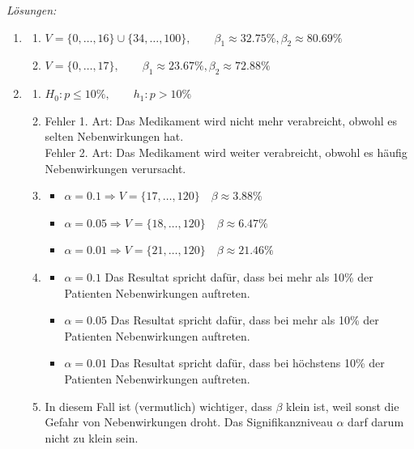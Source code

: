 \clearpage
\emph{Lösungen:}
\begin{enumerate}
    \item

          \begin{enumerate}
              \item \(V=\{0,\dots, 16\} \cup \{34,\dots, 100\}, \qquad \beta_1\approx 32.75\%, \beta_2 \approx 80.69\%\)
              \item  \(V=\{0,\dots, 17\} , \qquad \beta_1\approx 23.67\%, \beta_2 \approx 72.88\%\)
          \end{enumerate}
    \item \begin{enumerate}
              \item \(H_0: p\le 10\%, \qquad h_1: p > 10\%\)
              \item Fehler 1. Art: Das Medikament wird nicht mehr verabreicht, obwohl es selten Nebenwirkungen hat.\\
                    Fehler 2. Art: Das Medikament wird weiter verabreicht, obwohl es häufig Nebenwirkungen verursacht.
              \item \begin{itemize}
                        \item \(\alpha = 0.1 \Rightarrow V = \{17, \dots, 120\} \quad \beta \approx 3.88\%\)
                        \item \(\alpha = 0.05 \Rightarrow V = \{18, \dots, 120\} \quad \beta \approx 6.47\%\)
                        \item \(\alpha = 0.01 \Rightarrow V = \{21, \dots, 120\} \quad \beta \approx 21.46\%\)
                    \end{itemize}
              \item
                    \begin{itemize}
                        \item \(\alpha = 0.1\) Das Resultat spricht dafür, dass bei mehr als 10\% der Patienten Nebenwirkungen auftreten.
                        \item \(\alpha = 0.05\) Das Resultat spricht dafür, dass bei mehr als 10\% der Patienten Nebenwirkungen auftreten.
                        \item \(\alpha = 0.01\) Das Resultat spricht dafür, dass bei höchstens 10\% der Patienten Nebenwirkungen auftreten.
                    \end{itemize}
              \item In diesem Fall ist (vermutlich) wichtiger, dass \(\beta\) klein ist, weil sonst die Gefahr von Nebenwirkungen droht. Das Signifikanzniveau \(\alpha\) darf darum nicht zu klein sein.
          \end{enumerate}
\end{enumerate}